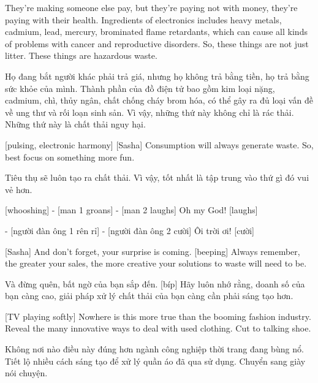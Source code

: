 \documentclass[a4paper]{article}
\begin{document}
	They're making someone else pay, but they're paying not with money, they're paying with their health.
	Ingredients of electronics includes heavy metals, cadmium, lead, mercury, brominated flame retardants, which can cause all kinds of problems with cancer and reproductive disorders.
	So, these things are not just litter. These things are hazardous waste.
	
	\begin{vietnamese-v2}
		Họ đang bắt người khác phải trả giá, nhưng họ không trả bằng tiền, họ trả bằng sức khỏe của mình.
		Thành phần của đồ điện tử bao gồm kim loại nặng, cadmium, chì, thủy ngân, chất chống cháy brom hóa, có thể gây ra đủ loại vấn đề về ung thư và rối loạn sinh sản.
		Vì vậy, những thứ này không chỉ là rác thải. Những thứ này là chất thải nguy hại.
	\end{vietnamese-v2}
	
	[pulsing, electronic harmony]
	[Sasha] Consumption will always generate waste.
	So, best focus on something more fun.
	
	\begin{vietnamese-v2}
		 Tiêu thụ sẽ luôn tạo ra chất thải.
		Vì vậy, tốt nhất là tập trung vào thứ gì đó vui vẻ hơn.
	\end{vietnamese-v2}
	
	[whooshing]
	- [man 1 groans] - [man 2 laughs]
	Oh my God! [laughs]
	
	\begin{vietnamese-v2}
		[vù vù]
		- [người đàn ông 1 rên rỉ] - [người đàn ông 2 cười]
		Ôi trời ơi! [cười]
	\end{vietnamese-v2}
	
	[Sasha] And don't forget, your surprise is coming.
	[beeping]
	Always remember, the greater your sales, the more creative your solutions to waste will need to be.
	
	\begin{vietnamese-v2}
		[Sasha] Và đừng quên, bất ngờ của bạn sắp đến.
		[bíp]
		Hãy luôn nhớ rằng, doanh số của bạn càng cao, giải pháp xử lý chất thải của bạn càng cần phải sáng tạo hơn.
	\end{vietnamese-v2}
	
	[TV playing softly]
	Nowhere is this more true than the booming fashion industry.
	Reveal the many innovative ways to deal with used clothing.
	Cut to talking shoe.
	
	\begin{vietnamese-v2}
		Không nơi nào điều này đúng hơn ngành công nghiệp thời trang đang bùng nổ.
		Tiết lộ nhiều cách sáng tạo để xử lý quần áo đã qua sử dụng.
		Chuyển sang giày nói chuyện.
	\end{vietnamese-v2}
	
\end{document}
